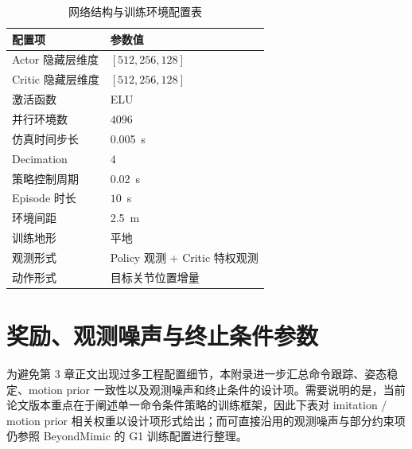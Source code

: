 \begin{table}[htbp]
  \centering
  \caption{网络结构与训练环境配置表}
  \label{tab:rl-env-config}
  \begin{tabular}{ll}
    \toprule
    配置项 & 参数值 \\
    \midrule
    Actor 隐藏层维度 & $[512,256,128]$ \\
    Critic 隐藏层维度 & $[512,256,128]$ \\
    激活函数 & ELU \\
    并行环境数 & $4096$ \\
    仿真时间步长 & \SI{0.005}{s} \\
    Decimation & $4$ \\
    策略控制周期 & \SI{0.02}{s} \\
    Episode 时长 & $10$~s \\
    环境间距 & \SI{2.5}{m} \\
    训练地形 & 平地 \\
    观测形式 & Policy 观测 + Critic 特权观测 \\
    动作形式 & 目标关节位置增量 \\
    \bottomrule
  \end{tabular}
\end{table}

\section{奖励、观测噪声与终止条件参数}

为避免第 3 章正文出现过多工程配置细节，本附录进一步汇总命令跟踪、姿态稳定、motion prior 一致性以及观测噪声和终止条件的设计项。需要说明的是，当前论文版本重点在于阐述单一命令条件策略的训练框架，因此下表对 imitation / motion prior 相关权重以设计项形式给出；而可直接沿用的观测噪声与部分约束项仍参照 BeyondMimic 的 G1 训练配置进行整理。

